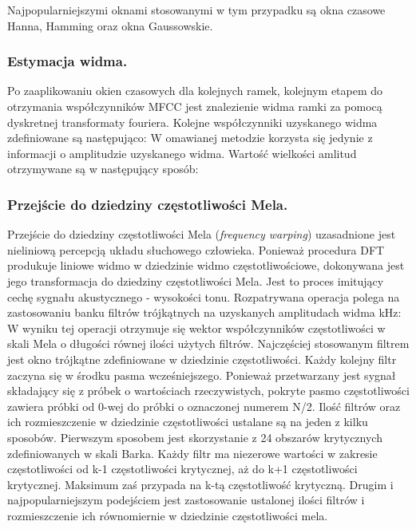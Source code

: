 Najpopularniejszymi oknami stosowanymi w tym przypadku są okna czasowe Hanna, Hamming oraz okna Gaussowskie.

\subsubsection{Estymacja widma.}
Po zaaplikowaniu okien czasowych dla kolejnych ramek, kolejnym etapem do otrzymania współczynników MFCC jest znalezienie widma ramki za pomocą dyskretnej transformaty fouriera. Kolejne współczynniki uzyskanego widma zdefiniowane są następująco:
W omawianej metodzie korzysta się jedynie z informacji o amplitudzie uzyskanego widma. Wartość wielkości amlitud otrzymywane są w następujący sposób:

\subsubsection{Przejście do dziedziny częstotliwości Mela.}
Przejście do dziedziny częstotliwości Mela (\textit{frequency warping}) uzasadnione jest nieliniową percepcją układu słuchowego człowieka. Ponieważ procedura DFT produkuje liniowe widmo w dziedzinie widmo częstotliwościowe, dokonywana jest jego transformacja do dziedziny częstotliwości Mela. Jest to proces imitujący cechę sygnału akustycznego - wysokości tonu.
Rozpatrywana operacja polega na zastosowaniu banku filtrów trójkątnych na uzyskanych amplitudach widma kHz:
W wyniku tej operacji otrzymuje się wektor współczynników częstotliwości w skali Mela o długości równej ilości użytych filtrów. Najczęściej stosowanym filtrem jest okno trójkątne zdefiniowane w dziedzinie częstotliwości. Każdy kolejny filtr zaczyna się w środku pasma wcześniejszego. Ponieważ przetwarzany jest sygnał składający się z próbek o wartościach rzeczywistych, pokryte pasmo częstotliwości zawiera próbki od 0-wej do próbki o oznaczonej numerem N/2. Ilość filtrów oraz ich rozmieszczenie w dziedzinie częstotliwości ustalane są na jeden z kilku sposobów.
Pierwszym sposobem jest skorzystanie z 24 obszarów krytycznych zdefiniowanych w skali Barka. Każdy filtr ma niezerowe wartości w zakresie częstotliwości od k-1 częstotliwości krytycznej, aż do k+1 częstotliwości krytycznej. Maksimum zaś przypada na k-tą częstotliwość krytyczną.
Drugim i najpopularniejszym podejściem jest zastosowanie ustalonej ilości filtrów i rozmieszczenie ich równomiernie w dziedzinie częstotliwości mela.

